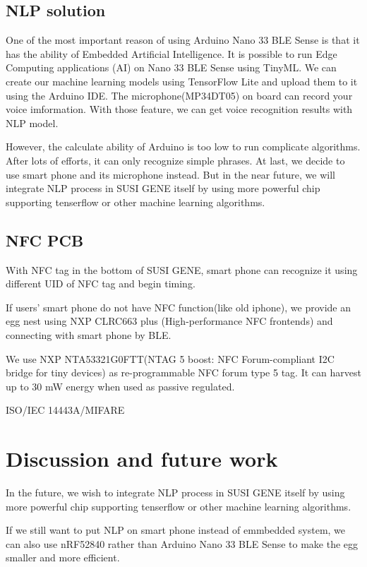 \documentclass[manuscript,screen]{acmart}
\begin{document}
\subsection{NLP solution}

One of the most important reason of using Arduino Nano 33 BLE Sense is that it has the ability of Embedded Artificial Intelligence. It is possible to run Edge Computing applications (AI) on Nano 33 BLE Sense using TinyML. We can create our machine learning models using TensorFlow Lite and upload them to it using the Arduino IDE. The microphone(MP34DT05) on board can record your voice imformation. With those feature, we can get voice recognition results with NLP model.

However, the calculate ability of Arduino is too low to run complicate algorithms. After lots of efforts, it can only recognize simple phrases. At last, we decide to use smart phone and its microphone instead. But in the near future, we will integrate NLP process in SUSI GENE itself by using more powerful chip supporting tenserflow or other machine learning algorithms. 

\subsection{NFC PCB}

With NFC tag in the bottom of SUSI GENE, smart phone can recognize it using different UID of NFC tag and begin timing.

If users' smart phone do not have NFC function(like old iphone), we provide an egg nest using NXP CLRC663 plus (High-performance NFC frontends) and connecting with smart phone by BLE.

We use NXP NTA53321G0FTT(NTAG 5 boost: NFC Forum-compliant I2C bridge for tiny devices) as re-programmable NFC forum type 5 tag. It can harvest up to 30 mW energy when used as passive regulated.

ISO/IEC 14443A/MIFARE

\section{Discussion and future work}

In the future, we wish to integrate NLP process in SUSI GENE itself by using more powerful chip supporting tenserflow or other machine learning algorithms. 

If we still want to put NLP on smart phone instead of emmbedded system, we can also use nRF52840 rather than Arduino Nano 33 BLE Sense to make the egg smaller and more efficient.




\end{document}
